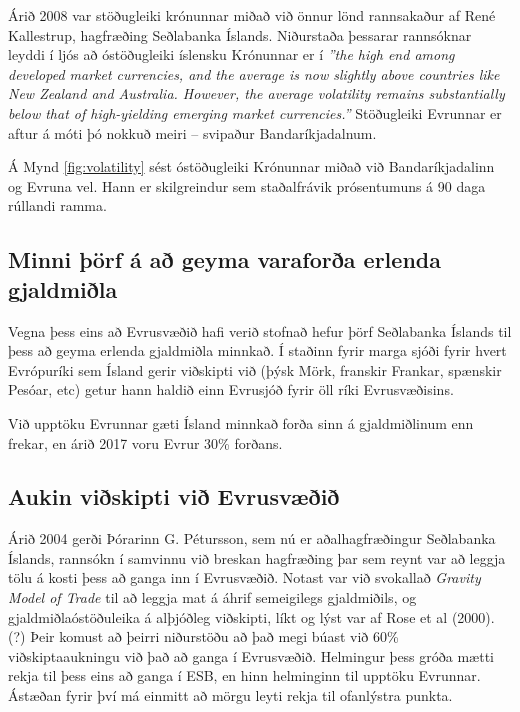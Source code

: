 \documentclass[a4paper]{article}
\begin{document}
Árið 2008 var stöðugleiki krónunnar miðað við önnur lönd rannsakaður af René Kallestrup, hagfræðing Seðlabanka Íslands. Niðurstaða þessarar rannsóknar leyddi í ljós að óstöðugleiki íslensku Krónunnar er í \textit{''the high end among developed market currencies, and the average is now slightly above countries like New Zealand and Australia. However, the average volatility remains substantially below that of high-yielding emerging market currencies.''} Stöðugleiki Evrunnar er aftur á móti þó nokkuð meiri – svipaður Bandaríkjadalnum.\cite{icb_volatility_2008}

Á Mynd \ref{fig:volatility} sést óstöðugleiki Krónunnar miðað við Bandaríkjadalinn og Evruna vel. Hann er skilgreindur sem staðalfrávik prósentumuns á 90 daga rúllandi ramma.

\subsection{Minni þörf á að geyma varaforða erlenda gjaldmiðla}

Vegna þess eins að Evrusvæðið hafi verið stofnað hefur þörf Seðlabanka Íslands til þess að geyma erlenda gjaldmiðla minnkað. Í staðinn fyrir marga sjóði fyrir hvert Evrópuríki sem Ísland gerir viðskipti við (þýsk Mörk, franskir Frankar, spænskir Pesóar, etc) getur hann haldið einn Evrusjóð fyrir öll ríki Evrusvæðisins.

Við upptöku Evrunnar gæti Ísland minnkað forða sinn á gjaldmiðlinum enn frekar\cite{saga_evropusamrunans}, en árið 2017 voru Evrur 30\% forðans.\cite{icb_annual_2017}

\subsection{Aukin viðskipti við Evrusvæðið}

Árið 2004 gerði Þórarinn G. Pétursson, sem nú er aðalhagfræðingur Seðlabanka Íslands, rannsókn í samvinnu við breskan hagfræðing þar sem reynt var að leggja tölu á kosti þess að ganga inn í Evrusvæðið. Notast var við svokallað \textit{Gravity Model of Trade} til að leggja mat á áhrif semeigilegs gjaldmiðils, og gjaldmiðlaóstöðuleika á alþjóðleg viðskipti, líkt og lýst var af Rose et al (2000).(?) Þeir komust að þeirri niðurstöðu að það megi búast við 60\% viðskiptaaukningu við það að ganga í Evrusvæðið. Helmingur þess gróða mætti rekja til þess eins að ganga í ESB, en hinn helminginn til upptöku Evrunnar. Ástæðan fyrir því má einmitt að mörgu leyti rekja til ofanlýstra punkta.\cite{icb_wp_26}
\end{document}
